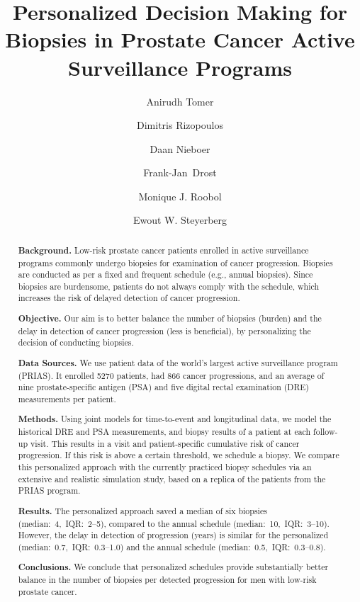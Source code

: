 \documentclass[a4paper, 12pt]{article}
\begin{document}
\title{\textbf{Personalized Decision Making for Biopsies in Prostate Cancer Active Surveillance Programs}}

\author[1,*]{\small Anirudh Tomer}
\author[1]{Dimitris Rizopoulos}
\author[2]{Daan Nieboer}
\author[3]{Frank-Jan~Drost}
\author[3]{Monique J. Roobol}
\author[2,4]{Ewout W. Steyerberg}

\date{}
\maketitle

\begin{abstract}
\textbf{Background.} Low-risk prostate cancer patients enrolled in active surveillance programs commonly undergo biopsies for examination of cancer progression. Biopsies are conducted as per a fixed and frequent schedule (e.g., annual biopsies). Since biopsies are burdensome, patients do not always comply with the schedule, which increases the risk of delayed detection of cancer progression.

\textbf{Objective.} Our aim is to better balance the number of biopsies (burden) and the delay in detection of cancer progression (less is beneficial), by personalizing the decision of conducting biopsies.

\textbf{Data Sources.} We use patient data of the world's largest active surveillance program (PRIAS). It enrolled 5270 patients, had 866 cancer progressions, and an average of nine prostate-specific antigen (PSA) and five digital rectal examination (DRE) measurements per patient.

\textbf{Methods.} Using joint models for time-to-event and longitudinal data, we model the historical DRE and PSA measurements, and biopsy results of a patient at each follow-up visit. This results in a visit and patient-specific cumulative risk of cancer progression. If this risk is above a certain threshold, we schedule a biopsy. We compare this personalized approach with the currently practiced biopsy schedules via an extensive and realistic simulation study, based on a replica of the patients from the PRIAS program.

\textbf{Results.} The personalized approach saved a median of six biopsies (median:~4,~IQR:~2--5), compared to the annual schedule (median:~10,~IQR:~3--10). However, the delay in detection of progression (years) is similar for the personalized (median:~0.7,~IQR:~0.3--1.0) and the annual schedule (median:~0.5,~IQR:~0.3--0.8).

\textbf{Conclusions.} We conclude that personalized schedules provide substantially better balance in the number of biopsies per detected progression for men with low-risk prostate cancer.
\end{abstract}
\end{document}
